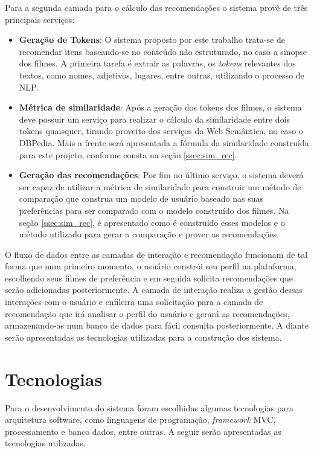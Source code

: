 Para a segunda camada para o cálculo das recomendações o sistema provê de três principais serviços:

\begin{itemize}
	\item{\textbf{Geração de Tokens}: O sistema proposto por este trabalho trata-se de recomendar itens baseando-se no conteúdo não estruturado, no caso a sinopse dos filmes. A primeira tarefa é extrair as palavras, os \textit{tokens} relevantes dos textos, como nomes, adjetivos, lugares, entre outras, utilizando o processo de \ac{NLP}.}
	
	\item{\textbf{Métrica de similaridade}: Após a geração dos tokens dos filmes, o sistema deve possuir um serviço para realizar o cálculo da similaridade entre dois tokens quaisquer, tirando proveito dos serviços da Web Semântica, no caso o DBPedia. Mais a frente será apresentada a fórmula da similaridade construída para este projeto, conforme consta na seção \ref{ssec:sim_rec}.}
	
	\item{\textbf{Geração das recomendações}: Por fim no último serviço, o sistema deverá ser capaz de utilizar a métrica de similaridade para construir um método de comparação que construa um modelo de usuário baseado nas suas preferências para ser comparado com o modelo construído dos filmes. Na seção \ref{ssec:sim_rec}, é apresentado como é construído esses modelos e o método utilizado para gerar a comparação e prover as recomendações.}
\end{itemize}

O fluxo de dados entre as camadas de interação e recomendação funcionam de tal forma que num primeiro momento, o usuário constrói seu perfil na plataforma, escolhendo seus filmes de preferência e em seguida solicita recomendações que serão adicionadas posteriormente. A camada de interação realiza a gestão dessas interações com o usuário e enfileira uma solicitação para a camada de recomendação que irá analisar o perfil do usuário e gerará as recomendações, armazenando-as num banco de dados para fácil consulta posteriormente. A diante serão apresentadas as tecnologias utilizadas para a construção dos sistema.

\section{Tecnologias}

Para o desenvolvimento do sistema foram escolhidas algumas tecnologias para arquitetura software, como linguagens de programação, \textit{framework} \ac{MVC}, processamento e banco dados, entre outras. A seguir serão apresentadas as tecnologias utilizadas.

